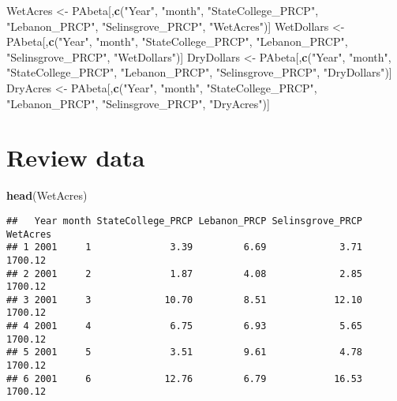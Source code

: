 \documentclass[]{article}
\newenvironment{Shaded}{\begin{snugshade}}{\end{snugshade}}
\newcommand{\KeywordTok}[1]{\textcolor[rgb]{0.13,0.29,0.53}{\textbf{{#1}}}}
\newcommand{\StringTok}[1]{\textcolor[rgb]{0.31,0.60,0.02}{{#1}}}
\newcommand{\NormalTok}[1]{{#1}}
\begin{document}
\begin{Shaded}
\begin{Highlighting}[]
\NormalTok{WetAcres <-}\StringTok{ }\NormalTok{PAbeta[,}\KeywordTok{c}\NormalTok{(}\StringTok{"Year"}\NormalTok{, }\StringTok{"month"}\NormalTok{, }\StringTok{"StateCollege_PRCP"}\NormalTok{, }\StringTok{"Lebanon_PRCP"}\NormalTok{, }\StringTok{"Selinsgrove_PRCP"}\NormalTok{, }\StringTok{"WetAcres"}\NormalTok{)]}
\NormalTok{WetDollars <-}\StringTok{ }\NormalTok{PAbeta[,}\KeywordTok{c}\NormalTok{(}\StringTok{"Year"}\NormalTok{, }\StringTok{"month"}\NormalTok{, }\StringTok{"StateCollege_PRCP"}\NormalTok{, }\StringTok{"Lebanon_PRCP"}\NormalTok{, }\StringTok{"Selinsgrove_PRCP"}\NormalTok{, }\StringTok{"WetDollars"}\NormalTok{)]}
\NormalTok{DryDollars <-}\StringTok{ }\NormalTok{PAbeta[,}\KeywordTok{c}\NormalTok{(}\StringTok{"Year"}\NormalTok{, }\StringTok{"month"}\NormalTok{, }\StringTok{"StateCollege_PRCP"}\NormalTok{, }\StringTok{"Lebanon_PRCP"}\NormalTok{, }\StringTok{"Selinsgrove_PRCP"}\NormalTok{, }\StringTok{"DryDollars"}\NormalTok{)]}
\NormalTok{DryAcres <-}\StringTok{ }\NormalTok{PAbeta[,}\KeywordTok{c}\NormalTok{(}\StringTok{"Year"}\NormalTok{, }\StringTok{"month"}\NormalTok{, }\StringTok{"StateCollege_PRCP"}\NormalTok{, }\StringTok{"Lebanon_PRCP"}\NormalTok{, }\StringTok{"Selinsgrove_PRCP"}\NormalTok{, }\StringTok{"DryAcres"}\NormalTok{)]}
\end{Highlighting}
\end{Shaded}

\section{Review data}\label{review-data}

\begin{Shaded}
\begin{Highlighting}[]
\KeywordTok{head}\NormalTok{(WetAcres)}
\end{Highlighting}
\end{Shaded}

\begin{verbatim}
##   Year month StateCollege_PRCP Lebanon_PRCP Selinsgrove_PRCP WetAcres
## 1 2001     1              3.39         6.69             3.71  1700.12
## 2 2001     2              1.87         4.08             2.85  1700.12
## 3 2001     3             10.70         8.51            12.10  1700.12
## 4 2001     4              6.75         6.93             5.65  1700.12
## 5 2001     5              3.51         9.61             4.78  1700.12
## 6 2001     6             12.76         6.79            16.53  1700.12
\end{verbatim}
\end{document}
